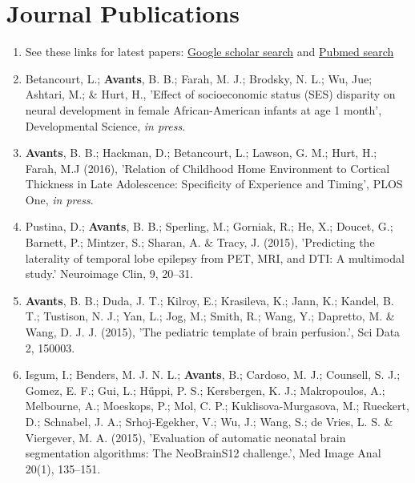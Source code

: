 \documentclass[11pt]{moderncv} %
\begin{document}
\section{Journal Publications} %
\begin{enumerate}
\item See these links for latest papers: \href{https://scholar.google.com/citations?hl=en&user=t4kkowgAAAAJ&view_op=list_works&sortby=pubdate}{Google scholar search} and \href{http://www.ncbi.nlm.nih.gov/pubmed?term=(\%22Avants\%20B\%22)\%20}{Pubmed  search}

\item Betancourt, L.; \textbf{Avants}, B. B.; Farah, M. J.; Brodsky, N. L.; Wu, Jue;  Ashtari, M.; \& Hurt, H., 'Effect of socioeconomic status (SES) disparity on neural development in female African-American infants at age 1 month', Developmental Science, \emph{in press}.

\item \textbf{Avants}, B. B.; Hackman, D.; Betancourt, L.; Lawson, G. M.; Hurt, H.; Farah, M.J (2016), 'Relation of Childhood Home Environment to Cortical Thickness in Late Adolescence: Specificity of Experience and Timing', PLOS One, \emph{in press}.

\item Pustina, D.; \textbf{Avants}, B. B.; Sperling, M.; Gorniak, R.; He, X.; Doucet, G.; Barnett, P.; Mintzer, S.; Sharan, A. \& Tracy, J. (2015), 'Predicting the laterality of temporal lobe epilepsy from PET, MRI, and DTI: A multimodal study.' Neuroimage Clin, 9, 20--31.

\item \textbf{Avants}, B. B.; Duda, J. T.; Kilroy, E.; Krasileva, K.; Jann, K.; Kandel, B. T.; Tustison, N. J.; Yan, L.; Jog, M.; Smith, R.; Wang, Y.; Dapretto, M. \& Wang, D. J. J. (2015), 'The pediatric template of brain perfusion.', Sci Data 2, 150003.

\item Isgum, I.; Benders, M. J. N. L.; \textbf{Avants}, B.; Cardoso, M. J.; Counsell, S. J.; Gomez, E. F.; Gui, L.; Hűppi, P. S.; Kersbergen, K. J.; Makropoulos, A.; Melbourne, A.; Moeskops, P.; Mol, C. P.; Kuklisova-Murgasova, M.; Rueckert, D.; Schnabel, J. A.; Srhoj-Egekher, V.; Wu, J.; Wang, S.; de Vries, L. S. \& Viergever, M. A. (2015), 'Evaluation of automatic neonatal brain segmentation algorithms: The NeoBrainS12 challenge.', Med Image Anal 20(1), 135--151.


\end{enumerate}
\end{document}
